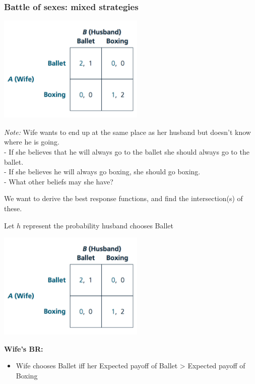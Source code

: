\documentclass[]{article}
\providecommand{\tightlist}{%
  \setlength{\itemsep}{0pt}\setlength{\parskip}{0pt}}
\begin{document}
\hypertarget{battle-of-sexes-mixed-strategies}{%
\subsubsection{Battle of sexes: mixed
strategies}\label{battle-of-sexes-mixed-strategies}}

\includegraphics[height=2in]{picsfigs/bosmatrix.png}

\emph{Note:} Wife wants to end up at the same place as her husband but
doesn't know where he is going.\\
- If she believes that he will always go to the ballet she should always
go to the ballet.\\
- If she believes he will always go boxing, she should go boxing.\\
- What other beliefs may she have?

We want to derive the best response functions, and find the
intersection(s) of these.

Let \(h\) represent the probability husband chooses Ballet

\includegraphics[height=2.0in]{picsfigs/bosmatrix.png}

\textbf{Wife's BR:}

\begin{itemize}
\tightlist
\item
  Wife chooses Ballet iff her Expected payoff of Ballet \textgreater{}
  Expected payoff of Boxing
\end{itemize}
\end{document}
